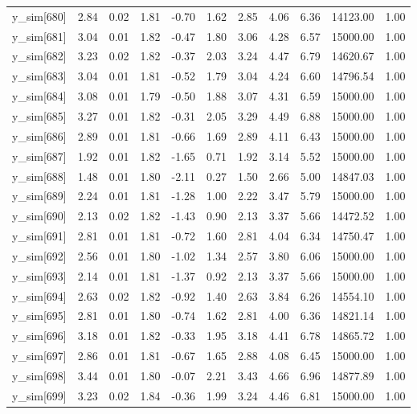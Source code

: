 \begin{table}[ht]
\begin{tabular}{rrrrrrrrrrr}
  y\_sim[680] & 2.84 & 0.02 & 1.81 & -0.70 & 1.62 & 2.85 & 4.06 & 6.36 & 14123.00 & 1.00 \\ 
  y\_sim[681] & 3.04 & 0.01 & 1.82 & -0.47 & 1.80 & 3.06 & 4.28 & 6.57 & 15000.00 & 1.00 \\ 
  y\_sim[682] & 3.23 & 0.02 & 1.82 & -0.37 & 2.03 & 3.24 & 4.47 & 6.79 & 14620.67 & 1.00 \\ 
  y\_sim[683] & 3.04 & 0.01 & 1.81 & -0.52 & 1.79 & 3.04 & 4.24 & 6.60 & 14796.54 & 1.00 \\ 
  y\_sim[684] & 3.08 & 0.01 & 1.79 & -0.50 & 1.88 & 3.07 & 4.31 & 6.59 & 15000.00 & 1.00 \\ 
  y\_sim[685] & 3.27 & 0.01 & 1.82 & -0.31 & 2.05 & 3.29 & 4.49 & 6.88 & 15000.00 & 1.00 \\ 
  y\_sim[686] & 2.89 & 0.01 & 1.81 & -0.66 & 1.69 & 2.89 & 4.11 & 6.43 & 15000.00 & 1.00 \\ 
  y\_sim[687] & 1.92 & 0.01 & 1.82 & -1.65 & 0.71 & 1.92 & 3.14 & 5.52 & 15000.00 & 1.00 \\ 
  y\_sim[688] & 1.48 & 0.01 & 1.80 & -2.11 & 0.27 & 1.50 & 2.66 & 5.00 & 14847.03 & 1.00 \\ 
  y\_sim[689] & 2.24 & 0.01 & 1.81 & -1.28 & 1.00 & 2.22 & 3.47 & 5.79 & 15000.00 & 1.00 \\ 
  y\_sim[690] & 2.13 & 0.02 & 1.82 & -1.43 & 0.90 & 2.13 & 3.37 & 5.66 & 14472.52 & 1.00 \\ 
  y\_sim[691] & 2.81 & 0.01 & 1.81 & -0.72 & 1.60 & 2.81 & 4.04 & 6.34 & 14750.47 & 1.00 \\ 
  y\_sim[692] & 2.56 & 0.01 & 1.80 & -1.02 & 1.34 & 2.57 & 3.80 & 6.06 & 15000.00 & 1.00 \\ 
  y\_sim[693] & 2.14 & 0.01 & 1.81 & -1.37 & 0.92 & 2.13 & 3.37 & 5.66 & 15000.00 & 1.00 \\ 
  y\_sim[694] & 2.63 & 0.02 & 1.82 & -0.92 & 1.40 & 2.63 & 3.84 & 6.26 & 14554.10 & 1.00 \\ 
  y\_sim[695] & 2.81 & 0.01 & 1.80 & -0.74 & 1.62 & 2.81 & 4.00 & 6.36 & 14821.14 & 1.00 \\ 
  y\_sim[696] & 3.18 & 0.01 & 1.82 & -0.33 & 1.95 & 3.18 & 4.41 & 6.78 & 14865.72 & 1.00 \\ 
  y\_sim[697] & 2.86 & 0.01 & 1.81 & -0.67 & 1.65 & 2.88 & 4.08 & 6.45 & 15000.00 & 1.00 \\ 
  y\_sim[698] & 3.44 & 0.01 & 1.80 & -0.07 & 2.21 & 3.43 & 4.66 & 6.96 & 14877.89 & 1.00 \\ 
  y\_sim[699] & 3.23 & 0.02 & 1.84 & -0.36 & 1.99 & 3.24 & 4.46 & 6.81 & 15000.00 & 1.00 \\ 

\end{tabular}
\end{table}
